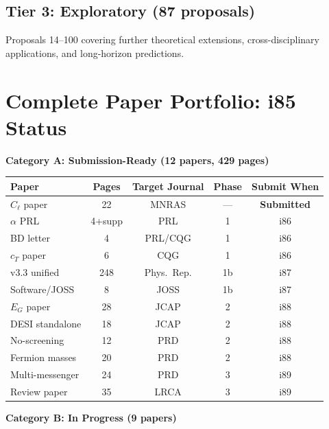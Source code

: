 \documentclass[11pt,a4paper]{article}
\begin{document}
\subsection{Tier 3: Exploratory (87 proposals)}

Proposals 14--100 covering further theoretical extensions, cross-disciplinary applications, and long-horizon predictions.

\section{Complete Paper Portfolio: i85 Status}

\begin{tcolorbox}[colback=blue!5!white, colframe=dfdblue, title=\textbf{Paper Portfolio: 3/4 Mark}]

\textbf{Category A: Submission-Ready (12 papers, 429 pages)}

\begin{center}
\begin{tabular}{lcccc}
\toprule
\textbf{Paper} & \textbf{Pages} & \textbf{Target Journal} & \textbf{Phase} & \textbf{Submit When} \\
\midrule
$C_\ell$ paper & 22 & MNRAS & --- & \textbf{Submitted} \\
$\alpha$ PRL & 4+supp & PRL & 1 & i86 \\
BD letter & 4 & PRL/CQG & 1 & i86 \\
$c_T$ paper & 6 & CQG & 1 & i86 \\
v3.3 unified & 248 & Phys.\ Rep. & 1b & i87 \\
Software/JOSS & 8 & JOSS & 1b & i87 \\
$E_G$ paper & 28 & JCAP & 2 & i88 \\
DESI standalone & 18 & JCAP & 2 & i88 \\
No-screening & 12 & PRD & 2 & i88 \\
Fermion masses & 20 & PRD & 2 & i88 \\
Multi-messenger & 24 & PRD & 3 & i89 \\
Review paper & 35 & LRCA & 3 & i89 \\
\bottomrule
\end{tabular}
\end{center}

\textbf{Category B: In Progress (9 papers)}


\end{tcolorbox}
\end{document}
